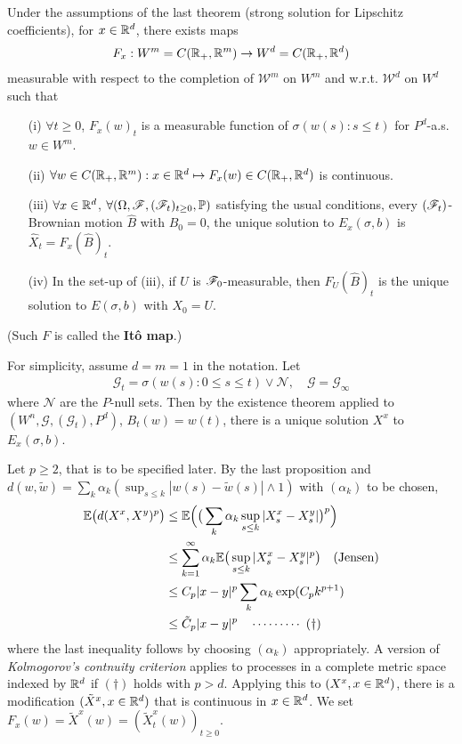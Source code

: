 \documentclass[10pt,a4paper]{article}
\newenvironment{proof}
{\begin{changemargin}{0.5cm}{0.5cm} 
	}%
	{\end{changemargin}
}
\newenvironment{p}
{\begin{proof} 
	}%
	{\end{proof}
}
\begin{document}
\thm Under the assumptions of the last theorem (strong solution for Lipschitz coefficients), for $x\in\mathbb{R}^d$, there exists maps
\begin{align*}
F_x : W^m = C(\mathbb{R}_+ , \mathbb{R}^m) \rightarrow W^d = C(\mathbb{R}_+, \mathbb{R}^d)
\end{align*}
measurable with respect to the completion of $\mathscr{W}^m$ on $W^m$ and w.r.t. $\mathscr{W}^d$ on $W^d$ such that
\begin{itemize}
\item[(i)] $\forall t\geq 0$, $F_x(w)_t$ is a measurable function of $\sigma (w(s) : s\leq t)$ for $P^d$-a.s. $w \in W^m$.
\item[(ii)] $\forall w\in C(\mathbb{R}_+, \mathbb{R}^m) : x\in \mathbb{R}^d \mapsto F_x(w) \in C(\mathbb{R}_+, \mathbb{R}^d)$ is continuous.
\item[(iii)] $\forall x\in \mathbb{R}^d$, $\forall (\Omega, \mathscr{F}, (\mathscr{F}_t)_{t\geq 0}, \mathbb{P})$ satisfying the usual conditions, every $(\mathscr{F}_t)$-Brownian motion $\hat{B}$ with $\hat{B}_0 =0$, the unique solution to $E_x(\sigma, b)$ is $\hat{X}_t = F_x(\hat{B})_t$.
\item[(iv)] In the set-up of (iii), if $U$ is $\mathscr{F}_0$-measurable, then $F_U(\hat{B})_t$ is the unique solution to $E(\sigma, b)$ with $X_0 =U$.
\end{itemize}
(Such $F$ is called the \textbf{It\^o map}.)
\begin{p}
\pf For simplicity, assume $d=m=1$ in the notation. Let
\begin{align*}
\mathscr{G}_t = \sigma(w(s) : 0\leq s\leq t) \vee \mathscr{N}, \quad \mathscr{G} = \mathscr{G}_{\infty}
\end{align*}
where $\mathscr{N}$ are the $P$-null sets. Then by the existence theorem applied to $(W^n, \mathscr{G}, (\mathscr{G}_t), P^d)$, $B_t(w) = w(t)$, there is a unique solution $X^x$ to $E_x(\sigma, b)$.

\quad Let $p\geq 2$, that is to be specified later. By the last proposition and $d(w, \tilde{w}) = \sum_{k} \alpha_k ( \sup_{s\leq k} |w(s)- \tilde{w}(s)| \wedge 1)$ with $(\alpha_k)$ to be chosen,
\begin{align*}
\mathbb{E} \big( d(X^x , X^y)^p \big) & \leq \mathbb{E} \Big( \big( \sum_k \alpha_k \sup_{s\leq k} |X_s^x - X_s^y| \big)^p \Big) \\
& \leq \sum_{k=1}^{\infty} \alpha_k \mathbb{E} \big( \sup_{s\leq k} |X_s^x - X_s^y|^p \big) \quad \text{(Jensen)} \\
& \leq C_p |x-y|^p \sum_{k} \alpha_k \exp ( C_p  k^{p+1})  \\
& \leq \tilde{C}_p |x-y|^p \quad \cdots\cdots\cdots\,\,(\dagger)
\end{align*}
where the last inequality follows by choosing $(\alpha_k)$ appropriately. A version of \emph{Kolmogorov's contnuity criterion} applies to processes in a complete metric space indexed by $\mathbb{R}^d$ if $(\dagger)$ holds with $p>d$. Applying this to $(X^x, x\in \mathbb{R}^d)$, there is a modification $(\tilde{X}^x, x\in \mathbb{R}^d)$ that is continuous in $x\in \mathbb{R}^d$. We set $F_x(w) = \tilde{X}^x(w) = (\tilde{X}^x_t (w))_{t \geq 0}$.
\end{p}
\s
\end{document}
